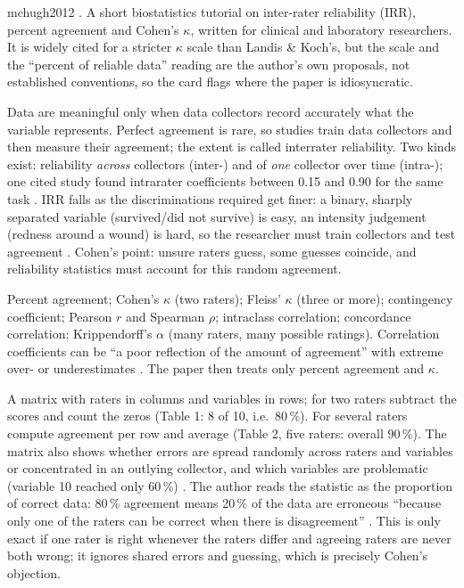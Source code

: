\begin{papercard}{mchugh2012}
 . A short biostatistics tutorial on inter-rater reliability (IRR), percent agreement and Cohen's $\kappa$, written for clinical and laboratory researchers. It is widely cited for a stricter $\kappa$ scale than Landis \& Koch's, but the scale and the ``percent of reliable data'' reading are the author's own proposals, not established conventions, so the card flags where the paper is idiosyncratic.

 Data are meaningful only when data collectors record accurately what the variable represents. Perfect agreement is rare, so studies train data collectors and then measure their agreement; the extent is called interrater reliability. Two kinds exist: reliability \emph{across} collectors (inter-) and of \emph{one} collector over time (intra-); one cited study found intrarater coefficients between 0.15 and 0.90 for the same task . IRR falls as the discriminations required get finer: a binary, sharply separated variable (survived/did not survive) is easy, an intensity judgement (redness around a wound) is hard, so the researcher must train collectors and test agreement . Cohen's point: unsure raters guess, some guesses coincide, and reliability statistics must account for this random agreement.

 Percent agreement; Cohen's $\kappa$ (two raters); Fleiss' $\kappa$ (three or more); contingency coefficient; Pearson $r$ and Spearman $\rho$; intraclass correlation; concordance correlation; Krippendorff's $\alpha$ (many raters, many possible ratings). Correlation coefficients can be ``a poor reflection of the amount of agreement'' with extreme over- or underestimates . The paper then treats only percent agreement and $\kappa$.

 A matrix with raters in columns and variables in rows; for two raters subtract the scores and count the zeros (Table 1: 8 of 10, i.e.\ 80\,\%). For several raters compute agreement per row and average (Table 2, five raters: overall 90\,\%). The matrix also shows whether errors are spread randomly across raters and variables or concentrated in an outlying collector, and which variables are problematic (variable 10 reached only 60\,\%) . The author reads the statistic as the proportion of correct data: 80\,\% agreement means 20\,\% of the data are erroneous ``because only one of the raters can be correct when there is disagreement'' . This is only exact if one rater is right whenever the raters differ and agreeing raters are never both wrong; it ignores shared errors and guessing, which is precisely Cohen's objection.


\end{papercard}
